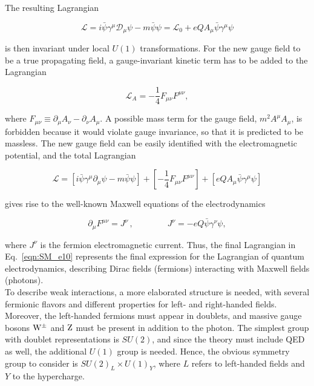 The resulting Lagrangian

\begin{equation}\label{eqn:SM_e8}
\mathcal{L} = i\bar{\psi}\gamma^\mu\mathcal{D}_\mu\psi - m\bar{\psi}\psi = \mathcal{L}_0 + eQA_\mu\bar{\psi}\gamma^\mu\psi
\end{equation}

\noindent is then invariant under local $U(1)$ transformations.
For the new gauge field to be a true propagating field, a gauge-invariant kinetic term has to be added to the Lagrangian

\begin{equation}\label{eqn:SM_e9}
\mathcal{L}_A = -\frac{1}{4}F_{\mu\nu}F^{\mu\nu},
\end{equation}

\noindent where $F_{\mu\nu} \equiv \partial_\mu A_\nu - \partial_\nu A_\mu$. 
A possible mass term for the gauge field, $m^2A^\mu A_\mu$, is forbidden because it would violate gauge invariance,
so that it is predicted to be massless.
The new gauge field can be easily identified with the electromagnetic potential,
and the total Lagrangian 

\begin{equation}\label{eqn:SM_e10}
\mathcal{L} = \left[ i\bar{\psi}\gamma^\mu\partial_\mu\psi - m\bar{\psi}\psi \right] + \left[ -\frac{1}{4}F_{\mu\nu}F^{\mu\nu} \right] + [eQA_\mu\bar{\psi}\gamma^\mu\psi]
\end{equation}

\noindent gives rise to the well-known Maxwell equations of the electrodynamics

\begin{equation}\label{eqn:SM_e11}
\partial_\mu F^{\mu\nu} = J^\nu \, , \qquad\qquad J^\nu = -eQ\bar{\psi}\gamma^\nu\psi,
\end{equation}

\noindent where $J^\nu$ is the fermion electromagnetic current.
Thus, the final Lagrangian in Eq.~\ref{eqn:SM_e10} represents the final expression for the Lagrangian of quantum electrodynamics,
describing Dirac fields (fermions) interacting with Maxwell fields (photons).\\

To describe weak interactions, a more elaborated structure is needed, with several fermionic flavors and different properties for left- and right-handed fields.
Moreover, the left-handed fermions must appear in doublets, and massive gauge bosons $\mathrm{W}^{\pm}$ and $\mathrm{Z}$ must be present in addition to the photon.
The simplest group with doublet representations is $SU(2)$, and since the theory must include QED as well, the additional $U(1)$ group is needed.
Hence, the obvious symmetry group to consider is $SU(2)_L \times U(1)_Y$, where $L$ refers to left-handed fields and $Y$ to the hypercharge.

